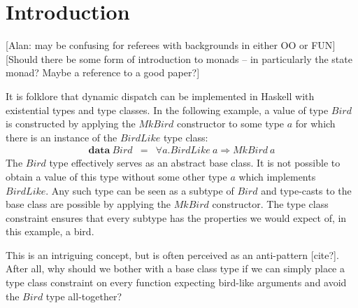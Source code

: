\documentclass[runningheads,a4paper]{llncs}
\newcommand{\todo}[1]{[{\color{blue}#1}]}
\begin{document}
\section{Introduction}
\label{sec:introduction}

\todo{Alan: may be confusing for referees with backgrounds in either OO or FUN}
\todo{Should there be some form of introduction to monads -- in particularly the state monad? Maybe a reference to a good paper?}

It is folklore that dynamic dispatch can be implemented in Haskell with existential types and type classes. In the following example, a value of type $\mathit{Bird}$ is constructed by applying the $\mathit{MkBird}$ constructor to some type $a$ for which there is an instance of the $\mathit{BirdLike}$ type class:
\begin{displaymath}
\begin{array}{lcl}
\mathbf{data}~\mathit{Bird} & = & \forall a. \mathit{BirdLike}~a \Rightarrow \mathit{MkBird}~a
\end{array}
\end{displaymath}
The $\mathit{Bird}$ type effectively serves as an abstract base class. It is not possible to obtain a value of this type without some other type $a$ which implements $\mathit{BirdLike}$. Any such type can be seen as a subtype of $\mathit{Bird}$ and type-casts to the base class are possible by applying the $\mathit{MkBird}$ constructor. The type class constraint ensures that every subtype has the properties we would expect of, in this example, a bird.

This is an intriguing concept, but is often perceived as an anti-pattern \todo{cite?}. After all, why should we bother with a base class type if we can simply place a type class constraint on every function expecting bird-like arguments and avoid the $\mathit{Bird}$ type all-together?
\end{document}
